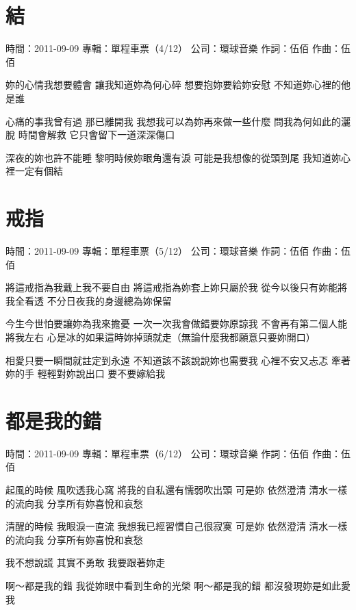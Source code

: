 \documentclass[UTF8,a4paper,oneside,twocolumn,12pt]{ctexbook}
\newcommand{\infopair}[2]{\textbullet #1：#2}
\newcommand{\zc}[1][伍佰]{\infopair{作詞}{#1}}
\newcommand{\zq}[1][伍佰]{\infopair{作曲}{#1}}
\newcommand{\zj}[1]{\infopair{專輯}{#1}}
\newcommand{\sj}[1]{\infopair{時間}{#1}}
\newcommand{\gs}[1]{\infopair{公司}{#1}}
\newenvironment{info}{\begin{flushleft}\kaishu
	}
	{\end{flushleft}\normalsize\yahei\par}
\newenvironment{lyric}{
	}
{}
\begin{document}
\section{結}
\begin{info}
	\sj{2011-09-09}
	\zj{單程車票（4/12）}
	\gs{環球音樂}
	\zc
	\zq
\end{info}
\begin{lyric}
	妳的心情我想要體會
	讓我知道妳為何心碎
	想要抱妳要給妳安慰
	不知道妳心裡的他是誰

	心痛的事我曾有過 那已離開我
	我想我可以為妳再來做一些什麼
	問我為何如此的灑脫 時間會解救
	它只會留下一道深深傷口

	深夜的妳也許不能睡
	黎明時候妳眼角還有淚
	可能是我想像的從頭到尾
	我知道妳心裡一定有個結
\end{lyric}

\section{戒指}
\begin{info}
	\sj{2011-09-09}
	\zj{單程車票（5/12）}
	\gs{環球音樂}
	\zc
	\zq
\end{info}
\begin{lyric}
	將這戒指為我戴上我不要自由
	將這戒指為妳套上妳只屬於我
	從今以後只有妳能將我全看透
	不分日夜我的身邊總為妳保留

	今生今世怕要讓妳為我來擔憂
	一次一次我會做錯要妳原諒我
	不會再有第二個人能將我左右
	心是冰的如果這時妳掉頭就走（無論什麼我都願意只要妳開口）

	相愛只要一瞬間就註定到永遠
	不知道該不該說說妳也需要我
	心裡不安又忐忑 牽著妳的手
	輕輕對妳說出口 要不要嫁給我
\end{lyric}

\section{都是我的錯}
\begin{info}
	\sj{2011-09-09}
	\zj{單程車票（6/12）}
	\gs{環球音樂}
	\zc
	\zq
\end{info}
\begin{lyric}
	起風的時候 風吹透我心窩
	將我的自私還有懦弱吹出頭
	可是妳 依然澄清
	清水一樣的流向我
	分享所有妳喜悅和哀愁

	清醒的時候 我眼淚一直流
	我想我已經習慣自己很寂寞
	可是妳 依然澄清
	清水一樣的流向我
	分享所有妳喜悅和哀愁

	我不想說謊
	其實不勇敢
	我要跟著妳走

	啊～都是我的錯
	我從妳眼中看到生命的光榮
	啊～都是我的錯
	都沒發現妳是如此愛我
\end{lyric}
\end{document}
